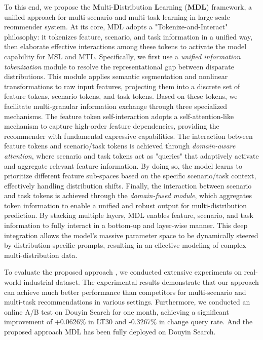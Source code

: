 To this end, we propose the \textbf{M}ulti-\textbf{D}istribution \textbf{L}earning (\textbf{MDL}) framework, a unified approach for multi-scenario and multi-task learning in large-scale reommender system.
At its core, MDL adopts a "Tokenize-and-Interact" philosophy: it tokenizes feature, scenario, and task information in a unified way, then elaborate effective interactions among these tokens to activate the model capability for MSL and MTL.
Specifically, we first use a \emph{unified information tokenization} module to resolve the representational gap between disparate distributions.
This module applies semantic segmentation and nonlinear transformations to raw input features, projecting them into a discrete set of feature tokens, scenario tokens, and task tokens.
Based on these tokens, we facilitate multi-granular information exchange through three specialized mechanisms.
The feature token self-interaction adopts a self-attention-like mechanism to capture high-order feature dependencies, providing the recommender with fundamental expressive capabilities.
The interaction between feature tokens and scenario/task tokens is achieved through \emph{domain-aware attention}, 
where scenario and task tokens act as "queries" that adaptively activate and aggregate relevant feature information. 
By doing so, the model learns to prioritize different feature sub-spaces based on the specific scenario/task context, effectively handling distribution shifts.
Finally, the interaction between scenario and task tokens is achieved through the \emph{domain-fused module}, which aggregates token information to enable a unified and robust output for multi-distribution prediction.
By stacking multiple layers, MDL enables feature, scenario, and task information to fully interact in a bottom-up and layer-wise manner.
This deep integration allows the model's massive parameter space to be dynamically steered by distribution-specific prompts, resulting in an effective modeling of complex multi-distribution data.

To evaluate the proposed approach \modelname, we conducted extensive experiments on real-world industrial dataset.
The experimental results demonstrate that our approach can achieve much better performance than competitors for multi-scenario and multi-task recommendations in various settings.
Furthermore, we conducted an online A/B test on Douyin Search for one month, achieving a significant improvement of +0.0626\% in LT30 and -0.3267\% in change query rate.
And the proposed approach MDL has been fully deployed on Douyin Search.
